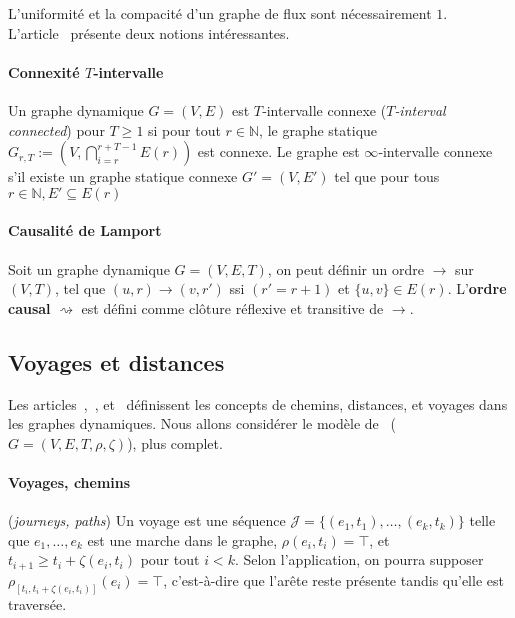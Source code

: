 \documentclass[12pt,a4paper]{article}
\begin{document}
L'uniformité et la compacité d'un graphe de flux sont nécessairement
\(1\).\\

L'article~\cite{DBLP:conf/stoc/KuhnLO10} présente deux notions
intéressantes.

\paragraph{Connexité \(T\)‑intervalle}
Un graphe dynamique \(G = (V, E)\) est \(T\)‑intervalle connexe
(\textit{\(T\)‑interval connected}) pour \(T \geq 1\) si pour tout
\(r \in \mathbb{N}\), le graphe statique
\(G_{r,T} := \left(V, \bigcap_{i=r}^{r+T-1} E(r)\right)\) est
connexe. Le graphe est \(\infty\)‑intervalle connexe s'il existe un
graphe statique connexe \(G' = (V, E')\) tel que pour tous
\(r \in \mathbb{N}, E' \subseteq E(r)\)

\paragraph{Causalité de Lamport}
Soit un graphe dynamique \(G = (V, E, T)\), on peut définir un ordre
\(\rightarrow\) sur \((V, T)\), tel que
\((u, r) \rightarrow (v, r')\) ssi \((r' = r + 1)\) et
\(\{u, v\} \in E(r)\). L'\textbf{ordre causal} \(\rightsquigarrow\)
est défini comme clôture réflexive et transitive de \(\rightarrow\).

\subsection{Voyages et distances}

Les
articles~\cite{DBLP:journals/ijfcs/XuanFJ03},~\cite{DBLP:journals/paapp/CasteigtsFQS12},
et~\cite{DBLP:journals/corr/abs-1710-04073} définissent les concepts
de chemins, distances, et voyages dans les graphes dynamiques. Nous
allons considérer le modèle
de~\cite{DBLP:journals/paapp/CasteigtsFQS12}
(\(G = (V, E, T, \rho, \zeta)\)), plus complet.

\paragraph{Voyages, chemins} (\textit{journeys, paths}) Un voyage est
une séquence \(\mathcal{J} = \{(e_1, t_1), \dots, (e_k, t_k)\}\) telle
que \({e_1, \dots, e_k}\) est une marche dans le graphe,
\(\rho(e_i, t_i) = \top\), et \(t_{i+1} \geq t_i + \zeta(e_i, t_i)\)
pour tout \(i < k\). Selon l'application, on pourra supposer
\(\rho_{[t_i, t_i + \zeta(e_i, t_i)]}(e_i) = \top\), c'est-à-dire que
l'arête reste présente tandis qu'elle est traversée.
\end{document}
